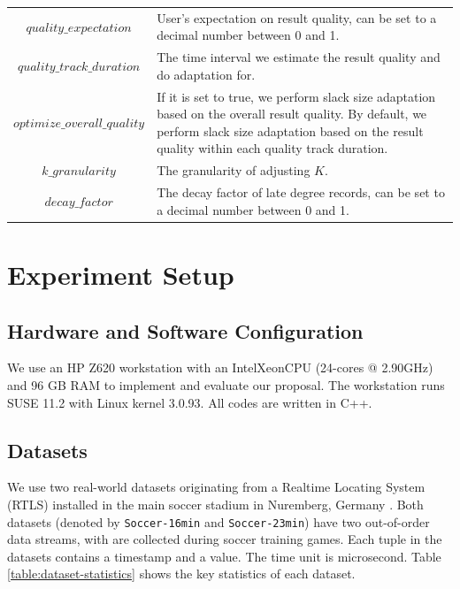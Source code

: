 \documentclass[a4paper, 11pt, twoside]{report}
\begin{document}
\begin{tabular}{cp{3in}}
$quality\_expectation$ & User's expectation on result quality, can be set to a decimal number between 0 and 1.\\[10pt]

$quality\_track\_duration$ & The time interval we estimate the result quality and do adaptation for.\\[10pt]

$optimize\_overall\_quality$ & If it is set to true, we perform slack size adaptation based on the overall result quality. By default, we perform slack size adaptation based on the result quality within each quality track duration.\\[10pt]

$k\_granularity$ &	The granularity of adjusting $K$.\\[10pt]

$decay\_factor$ &	The decay factor of late degree records, can be set to a decimal number between 0 and 1.\\
\end{tabular}


\section{Experiment Setup}
\label{subsec:experiment setup}

\subsection{Hardware and Software Configuration}

We use an HP Z620 workstation with an Intel\textregistered{ }Xeon\textregistered{ }CPU (24-cores @ 2.90GHz) and 96 GB RAM to implement and evaluate our proposal. The workstation runs SUSE 11.2 with Linux kernel 3.0.93. All codes are written in C++.

\subsection{Datasets}

We use two real-world datasets originating from a Realtime Locating System (RTLS) installed in the main soccer stadium in Nuremberg, Germany \cite{mutschler2013deb}. Both datasets (denoted by \texttt{Soccer-16min} and \texttt{Soccer-23min}) have two out-of-order data streams, with are collected during soccer training games. Each tuple in the datasets contains a timestamp and a value. The time unit is microsecond. Table \ref{table:dataset-statistics} shows the key statistics of each dataset.\\
\end{document}
